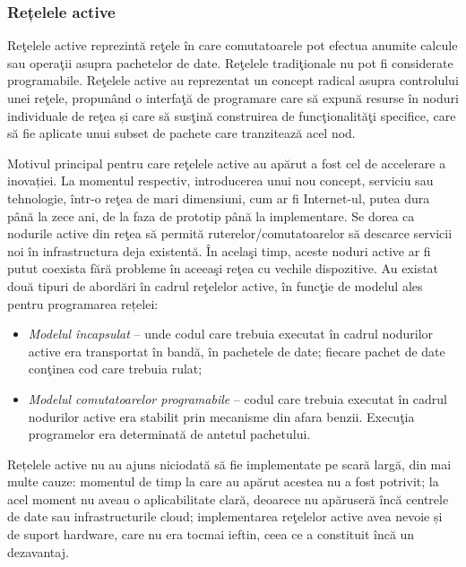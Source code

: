 \subsubsection{Rețelele active}

Reţelele active reprezintă reţele în care comutatoarele pot efectua anumite calcule sau operaţii asupra pachetelor de date. Reţelele tradiţionale nu pot fi considerate programabile. Reţelele active au reprezentat un concept radical asupra controlului unei reţele, propunând o interfaţă de programare care să expună resurse în noduri individuale de reţea și care să susţină construirea de funcţionalităţi specifice, care să fie aplicate unui subset de pachete care tranzitează acel nod.

Motivul principal pentru care reţelele active au apărut a fost cel de accelerare a inovației. La momentul respectiv, introducerea unui nou concept, serviciu sau tehnologie, într-o reţea de mari dimensiuni, cum ar fi Internet-ul, putea dura până la zece ani, de la faza de prototip până la implementare. Se dorea ca nodurile active din reţea să permită ruterelor/comutatoarelor să descarce servicii noi în infrastructura deja existentă. În acelaşi timp, aceste noduri active ar fi putut coexista fără probleme în aceeaşi reţea cu vechile dispozitive.
Au existat două tipuri de abordări în cadrul reţelelor active, în funcţie de modelul ales pentru programarea rețelei:
\begin{itemize}
\item \textit{Modelul încapsulat} – unde codul care trebuia executat în cadrul nodurilor active era transportat în bandă, în pachetele de date; fiecare pachet de date conţinea cod care trebuia rulat;
\item \textit{Modelul comutatoarelor programabile} – codul care trebuia executat în cadrul nodurilor active era stabilit prin mecanisme din afara benzii. Execuţia programelor era determinată de antetul pachetului.
\end{itemize}

Rețelele active nu au ajuns niciodată să fie implementate pe scară largă, din mai multe cauze: momentul de timp la care au apărut acestea nu a fost potrivit; la acel moment nu aveau o aplicabilitate clară, deoarece nu apăruseră încă centrele de date sau infrastructurile cloud; implementarea reţelelor active avea nevoie și de suport hardware, care nu era tocmai ieftin, ceea ce a constituit încă un dezavantaj.

